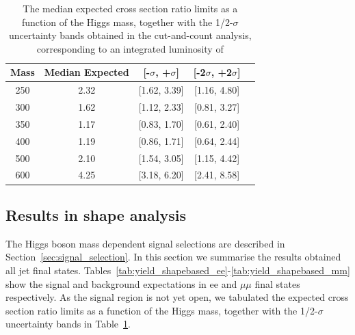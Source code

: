 
\begin{table}
\begin{center}
\begin{tabular}{ccccc}
\hline
 Mass & Median Expected & [-$\sigma$, +$\sigma$] & [-2$\sigma$, +2$\sigma$]\\\hline
250 & 2.32 & [1.62, 3.39] & [1.16, 4.80] \\
300 & 1.62 & [1.12, 2.33] & [0.81, 3.27] \\
350 & 1.17 & [0.83, 1.70] & [0.61, 2.40] \\
400 & 1.19 & [0.86, 1.71] & [0.64, 2.44] \\
500 & 2.10 & [1.54, 3.05] & [1.15, 4.42] \\
600 & 4.25 & [3.18, 6.20] & [2.41, 8.58] \\
\hline
\end{tabular}
\end{center}
\label{tab:limits_cutbased_2fb}
\caption{\fixme The median expected cross section ratio limits as a function 
of the Higgs mass, together with the 1/2-$\sigma$ uncertainty bands obtained in the cut-and-count analysis, corresponding to 
an integrated luminosity of \intlumi}
\end{table}

\subsection{Results in shape analysis} 

The Higgs boson mass dependent signal selections are described in Section~\ref{sec:signal_selection}. 
In this section we summarise the results obtained all jet final states. 
Tables~\ref{tab:yield_shapebased_ee}-\ref{tab:yield_shapebased_mm} show the signal %
and background expectations in ee and $\mu\mu$ final states respectively. 
As the signal region is not yet open, we tabulated the expected cross section ratio limits as a function 
of the Higgs mass, together with the 1/2-$\sigma$ uncertainty bands in Table~\ref{tab:limits_cutbased_2fb}.


